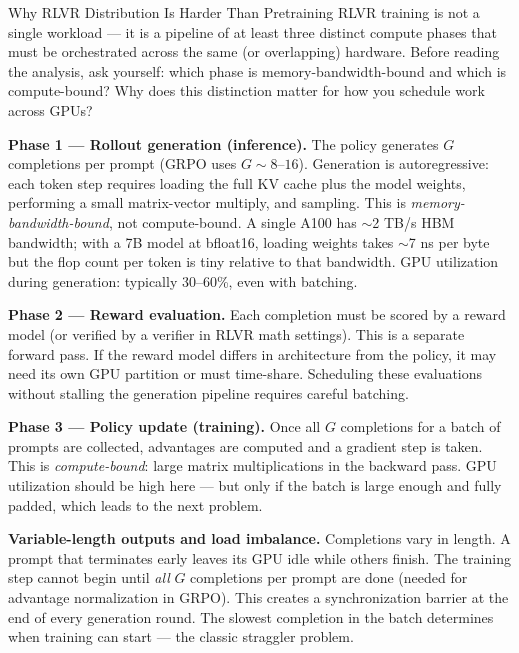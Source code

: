 \begin{thinkfirst}{Why RLVR Distribution Is Harder Than Pretraining}
RLVR training is not a single workload --- it is a pipeline of at least three distinct
compute phases that must be orchestrated across the same (or overlapping) hardware.
Before reading the analysis, ask yourself: which phase is memory-bandwidth-bound and which is
compute-bound?
Why does this distinction matter for how you schedule work across GPUs?

\medskip
\textbf{Phase 1 --- Rollout generation (inference).}
The policy generates $G$ completions per prompt (GRPO uses $G \sim 8$--$16$).
Generation is autoregressive: each token step requires loading the full KV cache plus the model
weights, performing a small matrix-vector multiply, and sampling.
This is \emph{memory-bandwidth-bound}, not compute-bound.
A single A100 has $\sim$2 TB/s HBM bandwidth; with a 7B model at bfloat16, loading weights takes
$\sim$7 ns per byte but the flop count per token is tiny relative to that bandwidth.
GPU utilization during generation: typically 30--60\%, even with batching.

\medskip
\textbf{Phase 2 --- Reward evaluation.}
Each completion must be scored by a reward model (or verified by a verifier in RLVR math settings).
This is a separate forward pass.
If the reward model differs in architecture from the policy, it may need its own GPU partition or
must time-share.
Scheduling these evaluations without stalling the generation pipeline requires careful batching.

\medskip
\textbf{Phase 3 --- Policy update (training).}
Once all $G$ completions for a batch of prompts are collected, advantages are computed and a gradient
step is taken.
This is \emph{compute-bound}: large matrix multiplications in the backward pass.
GPU utilization should be high here --- but only if the batch is large enough and
fully padded, which leads to the next problem.

\medskip
\textbf{Variable-length outputs and load imbalance.}
Completions vary in length.
A prompt that terminates early leaves its GPU idle while others finish.
The training step cannot begin until \emph{all} $G$ completions per prompt are done
(needed for advantage normalization in GRPO).
This creates a synchronization barrier at the end of every generation round.
The slowest completion in the batch determines when training can start --- the classic straggler problem.

\begin{center}
\end{center}
\end{thinkfirst}
